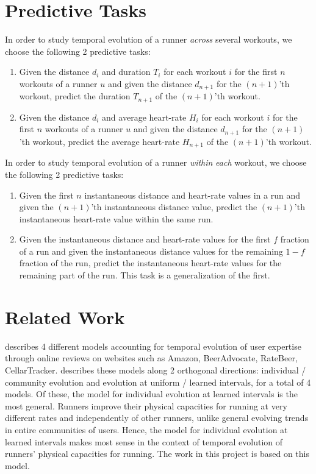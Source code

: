 \documentclass{acm_proc_article-sp}
\begin{document}
\section{Predictive Tasks}
\label{secPredictiveTasks}
In order to study temporal evolution of a runner \emph{across} several workouts, we choose the following 2 predictive tasks:
\begin{enumerate}
\item Given the distance $d_i$ and duration $T_i$ for each workout $i$ for the first $n$ workouts of a runner $u$ and given the distance $d_{n+1}$ for the $(n+1)$'th workout, predict the duration $T_{n+1}$ of the $(n+1)$'th workout.
\item Given the distance $d_i$ and average heart-rate $H_i$ for each workout $i$ for the first $n$ workouts of a runner $u$ and given the distance $d_{n+1}$ for the $(n+1)$'th workout, predict the average heart-rate $H_{n+1}$ of the $(n+1)$'th workout.
\end{enumerate}

In order to study temporal evolution of a runner \emph{within} \emph{each} workout, we choose the following 2 predictive tasks:

\begin{enumerate}
\item Given the first $n$ instantaneous distance and heart-rate values in a run and given the $(n+1)$'th instantaneous distance value, predict the $(n+1)$'th instantaneous heart-rate value within the same run.
\item Given the instantaneous distance and heart-rate values for the first $f$ fraction of a run and given the instantaneous distance values for the remaining $1-f$ fraction of the run, predict the instantaneous heart-rate values for the remaining part of the run. This task is a generalization of the first.
\end{enumerate}

\section{Related Work}
\label{secRelatedWork}
\cite{www13} describes 4 different models accounting for temporal evolution of user expertise through online reviews on websites such as Amazon, BeerAdvocate, RateBeer, CellarTracker. \cite{www13} describes these models along 2 orthogonal directions: individual / community evolution and evolution at uniform / learned intervals, for a total of 4 models. Of these, the model for individual evolution at learned intervals is the most general. Runners improve their physical capacities for running at very different rates and independently of other runners, unlike general evolving trends in entire communities of users. Hence, the model for individual evolution at learned intervals makes most sense in the context of temporal evolution of runners' physical capacities for running. The work in this project is based on this model.
\end{document}
